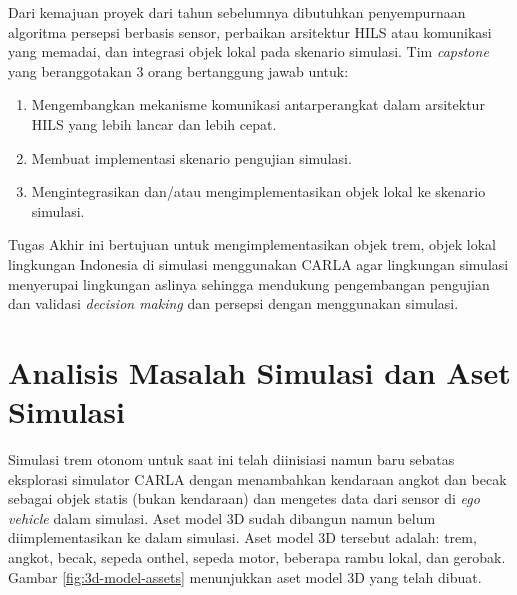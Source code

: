 Dari kemajuan proyek dari tahun sebelumnya dibutuhkan  penyempurnaan algoritma
persepsi berbasis sensor, perbaikan arsitektur HILS atau komunikasi yang
memadai, dan integrasi objek lokal pada skenario simulasi. Tim \textit{capstone}
yang beranggotakan 3 orang bertanggung jawab untuk:

\begin{enumerate}

	\item Mengembangkan mekanisme komunikasi antarperangkat dalam arsitektur
	HILS yang lebih lancar dan lebih cepat.
	\item Membuat implementasi skenario pengujian simulasi.
	\item Mengintegrasikan dan/atau mengimplementasikan objek lokal ke skenario
	simulasi.

\end{enumerate}

Tugas Akhir ini bertujuan untuk mengimplementasikan objek trem, objek lokal
lingkungan Indonesia di simulasi menggunakan CARLA agar lingkungan simulasi
menyerupai lingkungan aslinya sehingga mendukung pengembangan pengujian dan
validasi \textit{decision making} dan persepsi dengan menggunakan simulasi.

\section{Analisis Masalah Simulasi dan Aset Simulasi}

Simulasi trem otonom untuk saat ini telah diinisiasi namun baru sebatas
eksplorasi simulator CARLA dengan menambahkan kendaraan angkot dan becak sebagai
objek statis (bukan kendaraan) dan mengetes data dari sensor di \textit{ego
vehicle} dalam simulasi. Aset model 3D sudah dibangun namun belum
diimplementasikan ke dalam simulasi. Aset model 3D tersebut adalah: trem,
angkot, becak, sepeda onthel, sepeda motor, beberapa rambu lokal, dan gerobak.
Gambar \ref{fig:3d-model-assets} menunjukkan aset model 3D yang telah dibuat.

